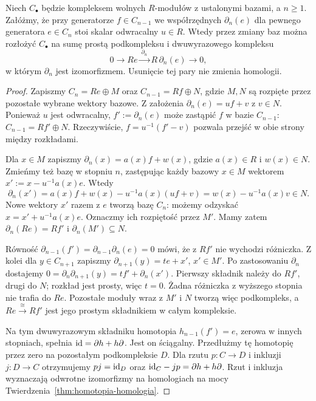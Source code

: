 \begin{twierdzenie}
\label{thm:kasowanie-pary}
Niech $C_\bullet$ będzie kompleksem
wolnych $R$-modułów z ustalonymi
bazami, a $n\geq1$. Załóżmy, że
przy generatorze $f\in C_{n-1}$
we współrzędnych $\partial_n(e)$ dla pewnego
generatora $e\in C_n$ stoi skalar
odwracalny $u\in R$.
Wtedy przez zmiany baz można rozłożyć
$C_\bullet$ na sumę prostą
podkompleksu i dwuwyrazowego kompleksu
\[
 0\longrightarrow R e
 \xrightarrow{\ \partial_n\ }R\,\partial_n(e)
 \longrightarrow0,
\]
w którym $\partial_n$ jest izomorfizmem.
Usunięcie tej pary nie zmienia homologii.
\end{twierdzenie}
\begin{proof}
Zapiszmy
$C_n=R e\oplus M$ oraz
$C_{n-1}=R f\oplus N$, gdzie
$M,N$ są rozpięte przez pozostałe
wybrane wektory bazowe.
Z założenia
$\partial_n(e)=u f+v$ z $v\in N$.
Ponieważ $u$ jest odwracalny,
$f':=\partial_n(e)$ może zastąpić $f$
w bazie $C_{n-1}$:
$C_{n-1}=R f'\oplus N$.
Rzeczywiście, $f=u^{-1}(f'-v)$
pozwala przejść w obie strony
między rozkładami.

Dla $x\in M$ zapiszmy
$\partial_n(x)=a(x)f+w(x)$,
gdzie $a(x)\in R$ i $w(x)\in N$.
Zmieńmy też bazę w stopniu $n$,
zastępując każdy bazowy $x\in M$
wektorem $x':=x-u^{-1}a(x)e$.
Wtedy
\[
 \partial_n(x')
 =a(x)f+w(x)-u^{-1}a(x)(uf+v)
 =w(x)-u^{-1}a(x)v\in N.
\]
Nowe wektory $x'$ razem z $e$
tworzą bazę $C_n$: możemy odzyskać
$x=x'+u^{-1}a(x)e$.
Oznaczmy ich rozpiętość przez $M'$.
Mamy zatem $\partial_n(Re)=Rf'$
i $\partial_n(M')\subseteq N$.

Równość $\partial_{n-1}(f')=\partial_{n-1}\partial_n(e)=0$
mówi, że z $Rf'$ nie wychodzi
różniczka. Z kolei dla $y\in C_{n+1}$
zapiszmy $\partial_{n+1}(y)=t e+x'$,
$x'\in M'$. Po zastosowaniu $\partial_n$
dostajemy
$0=\partial_n\partial_{n+1}(y)=t f'+\partial_n(x')$.
Pierwszy składnik należy do $Rf'$,
drugi do $N$; rozkład jest prosty,
więc $t=0$. Żadna różniczka
z wyższego stopnia nie trafia do $Re$.
Pozostałe moduły wraz z $M'$ i $N$
tworzą więc podkompleks, a
$Re\xrightarrow{\cong}Rf'$
jest jego prostym składnikiem
w całym kompleksie.

Na tym dwuwyrazowym składniku
homotopia $h_{n-1}(f')=e$,
zerowa w innych stopniach,
spełnia $\mathrm{id}=\partial h+h\partial$.
Jest on ściągalny. Przedłużmy tę homotopię przez zero na
pozostałym podkompleksie $D$. Dla rzutu $p:C\to D$ i inkluzji
$j:D\to C$ otrzymujemy $pj=\mathrm{id}_D$ oraz
$\mathrm{id}_C-jp=\partial h+h\partial$. Rzut i inkluzja
wyznaczają odwrotne izomorfizmy
na homologiach na mocy
Twierdzenia~\ref{thm:homotopia-homologia}.
\end{proof}

